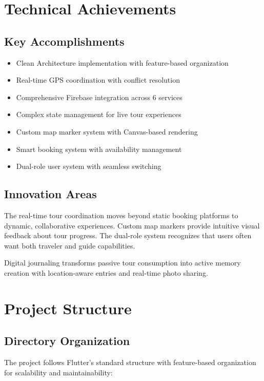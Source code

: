 \documentclass[12pt,a4paper]{article}
\begin{document}
\section{Technical Achievements}

\subsection{Key Accomplishments}
\begin{itemize}
    \item Clean Architecture implementation with feature-based organization
    \item Real-time GPS coordination with conflict resolution
    \item Comprehensive Firebase integration across 6 services
    \item Complex state management for live tour experiences
    \item Custom map marker system with Canvas-based rendering
    \item Smart booking system with availability management
    \item Dual-role user system with seamless switching
\end{itemize}

\subsection{Innovation Areas}

The real-time tour coordination moves beyond static booking platforms to dynamic, collaborative experiences. Custom map markers provide intuitive visual feedback about tour progress. The dual-role system recognizes that users often want both traveler and guide capabilities.

Digital journaling transforms passive tour consumption into active memory creation with location-aware entries and real-time photo sharing.

\section{Project Structure}

\subsection{Directory Organization}

The project follows Flutter's standard structure with feature-based organization for scalability and maintainability:
\end{document}

